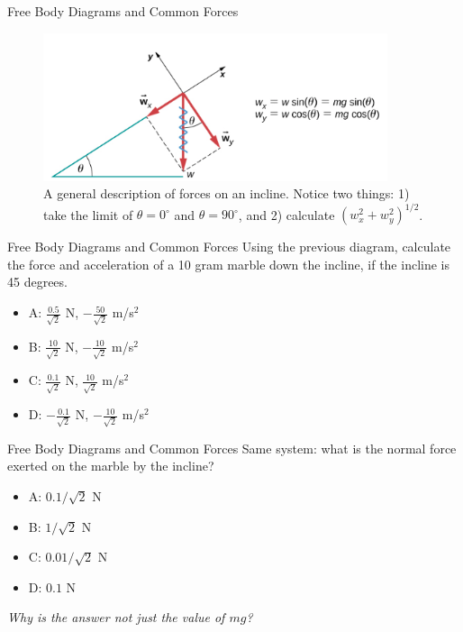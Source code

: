 \documentclass{beamer}
\begin{document}
\begin{frame}{Free Body Diagrams and Common Forces}
\begin{figure}
\centering
\includegraphics[width=0.9\textwidth]{figures/incline2.png}
\caption{\label{fig:incline2} A general description of forces on an incline.  Notice two things: 1) take the limit of $\theta = 0^{\circ}$ and $\theta = 90^{\circ}$, and 2) calculate $(w_x^2+w_y^2)^{1/2}$.}
\end{figure}
\end{frame}

\begin{frame}{Free Body Diagrams and Common Forces}
Using the previous diagram, calculate the force and acceleration of a 10 gram marble down the incline, if the incline is 45 degrees.
\begin{itemize}
\item A: $\frac{0.5}{\sqrt{2}}$ N, $-\frac{50}{\sqrt{2}}$ m/s$^2$
\item B: $\frac{10}{\sqrt{2}}$ N, $-\frac{10}{\sqrt{2}}$ m/s$^2$
\item C: $\frac{0.1}{\sqrt{2}}$ N, $\frac{10}{\sqrt{2}}$ m/s$^2$
\item D: $-\frac{0.1}{\sqrt{2}}$ N, $-\frac{10}{\sqrt{2}}$ m/s$^2$
\end{itemize}
\end{frame}

\begin{frame}{Free Body Diagrams and Common Forces}
Same system: what is the normal force exerted on the marble by the incline?
\begin{itemize}
\item A: $0.1/\sqrt{2}$ N
\item B: $1/\sqrt{2}$ N
\item C: $0.01/\sqrt{2}$ N
\item D: $0.1$ N
\end{itemize}
\textit{Why is the answer not just the value of $mg$?}
\end{frame}
\end{document}
